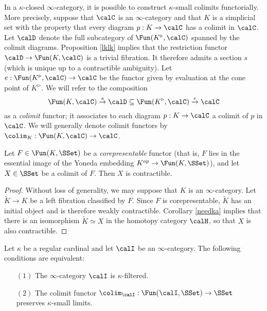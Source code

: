 In a $\kappa$-closed $\infty$-category, it is possible to construct $\kappa$-small colimits
functorially. More precisely, suppose that $\calC$ is an $\infty$-category and that $K$ is a simplicial set with the property that every diagram $p: K \rightarrow \calC$ has a colimit in $\calC$. Let $\calD$ denote the full subcategory of $\Fun(K^{\triangleright}, \calC)$ spanned by the colimit diagrams. Proposition \ref{lklk} implies that the restriction functor
$\calD \rightarrow \Fun(K,\calC)$ is a trivial fibration. It therefore admits a section $s$ (which is unique up to a contractible ambiguity). Let $e: \Fun(K^{\triangleright}, \calC) \rightarrow \calC$ be the functor given by evaluation at the cone point of $K^{\triangleright}$. We will refer to the composition
$$ \Fun(K,\calC) \stackrel{s}{\rightarrow} \calD \subseteq \Fun(K^{\triangleright}, \calC) \stackrel{e}{\rightarrow} \calC$$
as a {\it colimit} functor; it associates to each diagram $p: K \rightarrow \calC$ a colimit of $p$
in $\calC$. We will generally denote colimit functors by $\colim_{K}: \Fun(K,\calC) \rightarrow \calC$.

\begin{lemma}\label{tractab}
Let $F \in \Fun(K,\SSet)$ be a {\em corepresentable} functor (that is, $F$ lies in the essential image of the Yoneda embedding $K^{op} \rightarrow \Fun(K,\SSet)$), and let $X \in \SSet$ be a colimit of $F$. Then $X$ is contractible.
\end{lemma}

\begin{proof}
Without loss of generality, we may suppose that $K$ is an $\infty$-category. Let $\widetilde{K} \rightarrow K$ be a left fibration classified by $F$. Since $F$ is corepresentable, $\widetilde{K}$ has an initial object and is therefore weakly contractible. Corollary \ref{needka} implies that
there is an isomorphism $\widetilde{K} \simeq X$ in the homotopy category $\calH$, so that $X$ is also contractible.
\end{proof}

\begin{proposition}\label{frent}
Let $\kappa$ be a regular cardinal and let $\calI$ be an $\infty$-category. The following conditions are equivalent:
\begin{itemize}
\item[$(1)$] The $\infty$-category $\calI$ is $\kappa$-filtered.
\item[$(2)$] The colimit functor $\colim_{\calI}: \Fun(\calI, \SSet) \rightarrow \SSet$
preserves $\kappa$-small limits.
\end{itemize}
\end{proposition}

